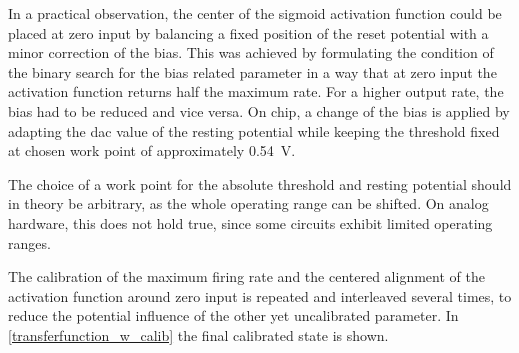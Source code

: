 In a practical observation, the center of the sigmoid activation function could be placed at zero input by balancing a fixed position of the reset potential with a minor correction of the bias. This was achieved by formulating the condition of the binary search for the bias related parameter in a way that at zero input the activation function returns half the maximum rate. For a higher output rate, the bias had to be reduced and vice versa. On chip, a change of the bias is applied by adapting the \gls{dac} value of the resting potential while keeping the threshold fixed at chosen work point of approximately \SI{0.54}{\V}.

The choice of a work point for the absolute threshold and resting potential should in theory be arbitrary, as the whole operating range can be shifted. On analog hardware, this does not hold true, since some circuits exhibit limited operating ranges.

The calibration of the maximum firing rate and the centered alignment of the activation function around zero input is repeated and interleaved several times, to reduce the potential influence of the other yet uncalibrated parameter. In \cref{transferfunction_w_calib} the final calibrated state is shown. 



